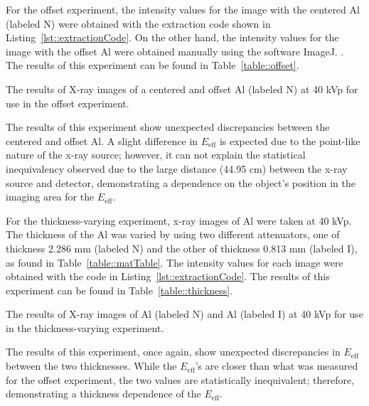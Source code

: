 \par For the offset experiment, the intensity values for the image with the centered Al (labeled N) were obtained with the extraction code shown in Listing~\ref{lst::extractionCode}. On the other hand, the intensity values for the image with the offset Al were obtained manually using the software ImageJ. \cite{ImageJ}. The results of this experiment can be found in Table~\ref{table::offset}.


\begin{table}[H]
    \small
    \noindent\makebox[\textwidth]{%
    
    }
    \caption{The results of X-ray images of a centered and offset Al (labeled N) at 40 kVp for use in the offset experiment.}
    \label{table::offset}
\end{table}

\par The results of this experiment show unexpected discrepancies between the centered and offset Al. A slight difference in $E_{\text{eff}}$ is expected due to the point-like nature of the x-ray source; however, it can not explain the statistical inequivalency observed due to the large distance (44.95 cm)\cite{CArm} between the x-ray source and detector, demonstrating a dependence on the object's position in the imaging area for the $E_{\text{eff}}$.

\par For the thickness-varying experiment, x-ray images of Al were taken at 40 kVp. The thickness of the Al was varied by using two different attenuators, one of thickness 2.286 mm (labeled N) and the other of thickness 0.813 mm (labeled I), as found in Table~\ref{table::matTable}. The intensity values for each image were obtained with the code in Listing~\ref{lst::extractionCode}. The results of this experiment can be found in Table~\ref{table::thickness}.

\begin{table}[H]
    \small
    \noindent\makebox[\textwidth]{%
    
    }
    \caption{The results of X-ray images of Al (labeled N) and Al (labeled I) at 40 kVp for use in the thickness-varying experiment.}
   	\label{table::thickness}
\end{table}

\par The results of this experiment, once again, show unexpected discrepancies in $E_{\text{eff}}$ between the two thicknesses. While the $E_{\text{eff}}$'s are closer than what was measured for the offset experiment, the two values are statistically inequivalent; therefore, demonstrating a thickness dependence of the $E_{\text{eff}}$.


